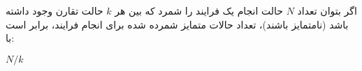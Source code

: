 
\begin{definition}
    اگر بتوان تعداد 
    $N$
    حالت انجام یک فرایند را شمرد که بین هر
    $k$
    حالت تقارن وجود داشته باشد
    (نامتمایز باشند)،
    تعداد حالات متمایز شمرده شده برای انجام فرایند، برابر است با:
    \begin{center}
    $N/k$
    \end{center}
\end{definition}

